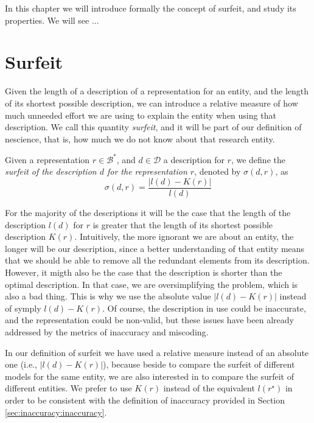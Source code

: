 In this chapter we will introduce formally the concept of surfeit, and study its properties. We will see ...

%
%

\section{Surfeit}
\label{sec:Definition_redundancy}

Given the length of a description of a representation for an entity, and the length of its shortest possible description, we can introduce a relative measure of how much unneeded effort we are using to explain the entity when using that description. We call this quantity \emph{surfeit}, and it will be part of our definition of nescience, that is, how much we do not know about that research entity.

\begin{definition}[Surfeit]
Given a representation $r \in \mathcal{B}^\ast$, and $d \in \mathcal{D}$ a description for $r$, we define the \emph{surfeit of the description $d$ for the representation $r$}, denoted by $\sigma(d, r)$, as
\[
\sigma (d, r) = \frac{ | l(d) - K(r) |}{l(d)}
\]
\end{definition}

For the majority of the descriptions it will be the case that the length of the description $l(d)$ for $r$ is greater that the length of its shortest possible description $K(r)$. Intuitively, the more ignorant we are about an entity, the longer will be our description, since a better understanding of that entity means that we should be able to remove all the redundant elements from its description. However, it migth also be the case that the description is shorter than the optimal description. In that case, we are oversimplifying the problem, which is also a bad thing. This is why we use the absolute value $| l(d) - K(r) |$ instead of symply $l(d) - K(r)$. Of course, the description in use could be inaccurate, and the representation could be non-valid, but these issues have been already addressed by the metrics of inaccuracy and miscoding.

In our definition of surfeit we have used a relative measure instead of an absolute one (i.e., $| l(d) - K(r) |$), because beside to compare the surfeit of different models for the same entity, we are also interested in to compare the surfeit of different entities. We prefer to use $K(r)$ instead of the equivalent $l \left( r^\star \right)$ in order to be consistent with the definition of inaccuracy provided in Section \ref{sec:inaccuracy:inaccuracy}.

